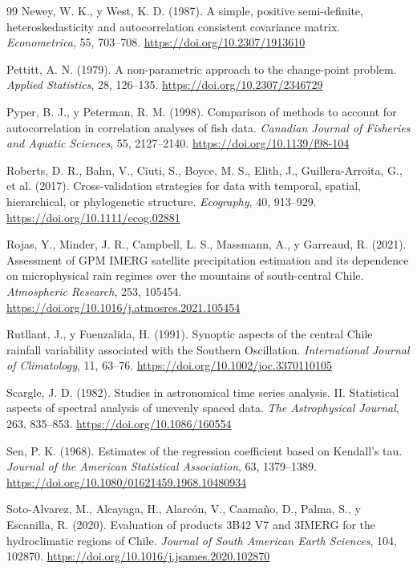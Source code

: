\documentclass[11pt,a4paper]{article}
\begin{document}
\begin{thebibliography}{99}
 Newey, W. K., y West, K. D. (1987). A simple, positive semi-definite, heteroskedasticity and autocorrelation consistent covariance matrix. \emph{Econometrica}, 55, 703--708. \url{https://doi.org/10.2307/1913610}

 Pettitt, A. N. (1979). A non-parametric approach to the change-point problem. \emph{Applied Statistics}, 28, 126--135. \url{https://doi.org/10.2307/2346729}

 Pyper, B. J., y Peterman, R. M. (1998). Comparison of methods to account for autocorrelation in correlation analyses of fish data. \emph{Canadian Journal of Fisheries and Aquatic Sciences}, 55, 2127--2140. \url{https://doi.org/10.1139/f98-104}

 Roberts, D. R., Bahn, V., Ciuti, S., Boyce, M. S., Elith, J., Guillera-Arroita, G., et al. (2017). Cross-validation strategies for data with temporal, spatial, hierarchical, or phylogenetic structure. \emph{Ecography}, 40, 913--929. \url{https://doi.org/10.1111/ecog.02881}

 Rojas, Y., Minder, J. R., Campbell, L. S., Massmann, A., y Garreaud, R. (2021). Assessment of GPM IMERG satellite precipitation estimation and its dependence on microphysical rain regimes over the mountains of south-central Chile. \emph{Atmospheric Research}, 253, 105454. \url{https://doi.org/10.1016/j.atmosres.2021.105454}

 Rutllant, J., y Fuenzalida, H. (1991). Synoptic aspects of the central Chile rainfall variability associated with the Southern Oscillation. \emph{International Journal of Climatology}, 11, 63--76. \url{https://doi.org/10.1002/joc.3370110105}

 Scargle, J. D. (1982). Studies in astronomical time series analysis. II. Statistical aspects of spectral analysis of unevenly spaced data. \emph{The Astrophysical Journal}, 263, 835--853. \url{https://doi.org/10.1086/160554}

 Sen, P. K. (1968). Estimates of the regression coefficient based on Kendall's tau. \emph{Journal of the American Statistical Association}, 63, 1379--1389. \url{https://doi.org/10.1080/01621459.1968.10480934}

 Soto-Alvarez, M., Alcayaga, H., Alarcón, V., Caamaño, D., Palma, S., y Escanilla, R. (2020). Evaluation of products 3B42 V7 and 3IMERG for the hydroclimatic regions of Chile. \emph{Journal of South American Earth Sciences}, 104, 102870. \url{https://doi.org/10.1016/j.jsames.2020.102870}


\end{thebibliography}
\end{document}
